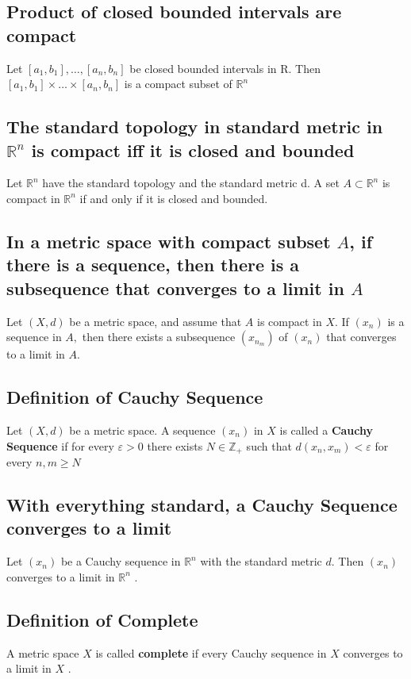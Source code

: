 \documentclass[12pt]{article}
\newcommand{\R}{\mathbb{R}}
\begin{document}
	\subsection{Product of closed bounded intervals are compact}
		Let $\left[ a _ { 1 } , b _ { 1 } \right] , \ldots , \left[ a _ { n } , b _ { n } \right]$ be closed bounded intervals in R. Then $\left[ a _ { 1 } , b _ { 1 } \right] \times \ldots \times \left[ a _ { n } , b _ { n } \right]$ is a compact subset of $\mathbb { R } ^ { n }$
	
	\subsection{The standard topology in standard metric in $ \R^n $ is compact iff it is closed and bounded}
	Let $\mathbb { R } ^ { n }$ have the standard topology and the standard metric
	d. A set $A \subset \mathbb { R } ^ { n }$ is compact in $\mathbb { R } ^ { n }$ if and only if it is closed and bounded.
	
	\subsection{In a metric space with compact subset $ A $, if there is a sequence, then there is a subsequence that converges to a limit in $ A $}
	Let $( X , d )$ be a metric space, and assume that $A$ is compact in $X .$ If $\left( x _ { n } \right)$ is a sequence in $A ,$ then there exists a subsequence $\left( x _ { n _ { m } } \right)$ of $\left( x _ { n } \right)$
 	that converges to a limit in $A .$
 	\subsection{Definition of Cauchy Sequence}
		 Let $( X , d )$ be a metric space. A sequence $\left( x _ { n } \right)$ in $X$ is
		called a \textbf{ Cauchy Sequence } if for every $\varepsilon > 0$ there exists $N \in \mathbb { Z } _ { + }$ such that $d \left( x _ { n } , x _ { m } \right) < \varepsilon$ for every $n , m \geq N$
	\subsection{With everything standard, a Cauchy Sequence converges to a limit}
		Let $\left( x _ { n } \right)$ be a Cauchy sequence in $\mathbb { R } ^ { n }$ with the standard metric $d .$ Then $\left( x _ { n } \right)$ converges to a limit in $\mathbb { R } ^ { n }$ .
	\subsection{Definition of Complete}
		A metric space $X$ is called \textbf{complete} if every Cauchy sequence in $X$ converges to a limit in $X$ .
\end{document}
